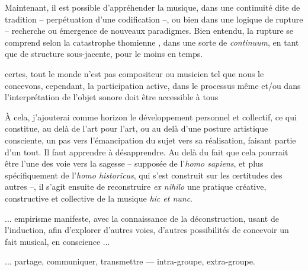 \documentclass{article}
\newcommand{\footref}[1]{%
  \enotezwritemark{\enmarkstyle\ref{#1}}%
}
\begin{document}
Maintenant, il est possible d'appréhender la musique, dans une continuité dite de tradition -- perpétuation d'une codification --, ou bien dans une logique de rupture -- recherche ou émergence de nouveaux paradigmes. Bien entendu, la rupture se comprend selon la catastrophe thomienne%
, dans une sorte de \textit{continuum}, en tant que de structure sous-jacente, pour le moins en temps. 

certes, tout le monde n’est pas compositeur ou musicien tel que nous le concevons, cependant, la participation active, dans le processus même et/ou dans l’interprétation de l’objet sonore doit être accessible à tous 



\bigskip

À cela, j'ajouterai comme horizon le développement personnel et collectif, ce qui constitue, au delà de l'art pour l'art, ou au delà d'une posture artistique consciente, un pas vers l'émancipation du sujet vers sa réalisation, faisant partie d'un tout. Il faut apprendre à désapprendre. 
Au delà du fait que cela pourrait être l'une des voie vers la sagesse -- supposée de l'\textit{homo sapiens}, et plus spécifiquement de l'\textit{homo historicus}, qui s'est construit sur les certitudes des autres --, il s'agit ensuite de reconstruire \textit{ex nihilo} une pratique créative, constructive et collective de la musique \textit{hic et nunc}. 

... empirisme manifeste, avec la connaissance de la déconstruction, usant de l'induction, afin d'explorer d'autres voies, d'autres possibilités de concevoir un fait musical, en conscience ...

... partage, communiquer, transmettre --- intra-groupe, extra-groupe.
\end{document}
